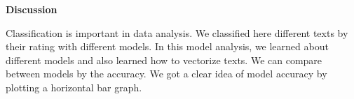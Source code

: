 \documentclass[12pt]{article}
\begin{document}
\vspace{\baselineskip}

\vspace{\baselineskip}
\begin{justify}
{\fontsize{14pt}{16.8pt}\selectfont \textbf{Discussion}\par}
\end{justify}\par

\begin{justify}
{\fontsize{14pt}{16.8pt}\selectfont Classification is important in data analysis. We classified here different texts by their rating with different models. In this model analysis, we learned about different models and also learned how to vectorize texts. We can compare between models by the accuracy. We got a clear idea of model accuracy by plotting a horizontal bar graph.\par}
\end{justify}\par
\end{document}
